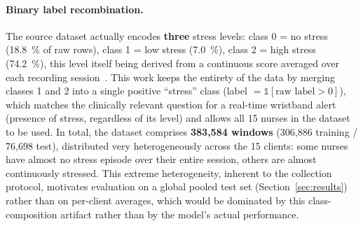\documentclass{article}
\begin{document}
\paragraph{Binary label recombination.} The source dataset actually encodes
\textbf{three} stress levels: class 0 = no stress (18.8~\% of raw rows), class 1 =
low stress (7.0~\%), class 2 = high stress (74.2~\%), this level itself being
derived from a continuous score averaged over each recording
session~\cite{nurse_stress_dataset}. This work keeps the entirety of the data by
merging classes 1 and 2 into a single positive ``stress'' class
(label $= \mathbb{1}[\text{raw label} > 0]$), which matches the clinically
relevant question for a real-time wristband alert (presence of stress, regardless
of its level) and allows all 15 nurses in the dataset to be used. In total, the
dataset comprises \textbf{383,584 windows} (306,886 training / 76,698 test),
distributed very heterogeneously across the 15 clients: some nurses have almost no
stress episode over their entire session, others are almost continuously stressed.
This extreme heterogeneity, inherent to the collection protocol, motivates
evaluation on a global pooled test set (Section~\ref{sec:results}) rather than on
per-client averages, which would be dominated by this class-composition artifact
rather than by the model's actual performance.
\end{document}
